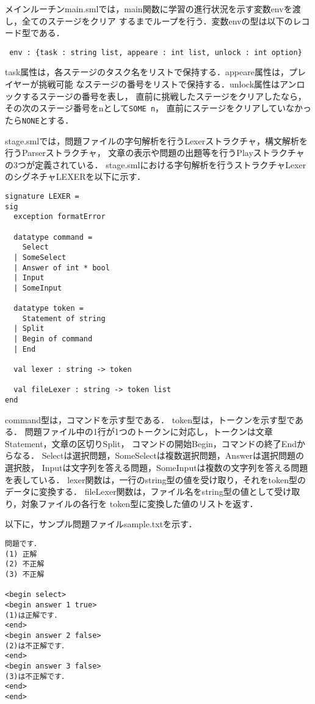 \documentclass{jreport}
\begin{document}
メインルーチンmain.smlでは，main関数に学習の進行状況を示す変数envを渡し，全てのステージをクリア
するまでループを行う．変数envの型は以下のレコード型である．

\begin{verbatim}
 env : {task : string list, appeare : int list, unlock : int option}
\end{verbatim}

task属性は，各ステージのタスク名をリストで保持する．appeare属性は，プレイヤーが挑戦可能
なステージの番号をリストで保持する．unlock属性はアンロックするステージの番号を表し，
直前に挑戦したステージをクリアしたなら，その次のステージ番号をnとして\verb|SOME n|，
直前にステージをクリアしていなかったら\verb|NONE|とする．

stage.smlでは，問題ファイルの字句解析を行うLexerストラクチャ，構文解析を行うParserストラクチャ，
文章の表示や問題の出題等を行うPlayストラクチャの3つが定義されている．
stage.smlにおける字句解析を行うストラクチャLexerのシグネチャLEXERを以下に示す．

\begin{Verbatim}
signature LEXER =
sig
  exception formatError

  datatype command =
    Select
  | SomeSelect
  | Answer of int * bool
  | Input
  | SomeInput

  datatype token =
    Statement of string
  | Split
  | Begin of command
  | End
  
  val lexer : string -> token
  
  val fileLexer : string -> token list
end
\end{Verbatim}

command型は，コマンドを示す型である．
token型は，トークンを示す型である．
問題ファイル中の1行が1つのトークンに対応し，トークンは文章Statement，文章の区切りSplit，
コマンドの開始Begin，コマンドの終了Endからなる．
Selectは選択問題，SomeSelectは複数選択問題，Answerは選択問題の選択肢，
Inputは文字列を答える問題，SomeInputは複数の文字列を答える問題を表している．
lexer関数は，一行のstring型の値を受け取り，それをtoken型のデータに変換する．
fileLexer関数は，ファイル名をstring型の値として受け取り，対象ファイルの各行を
token型に変換した値のリストを返す．

以下に，サンプル問題ファイルsample.txtを示す．

\begin{Verbatim}
問題です．
(1) 正解
(2) 不正解
(3) 不正解

<begin select>
<begin answer 1 true>
(1)は正解です．
<end>
<begin answer 2 false>
(2)は不正解です．
<end>
<begin answer 3 false>
(3)は不正解です．
<end>
<end>
\end{Verbatim}
\end{document}
